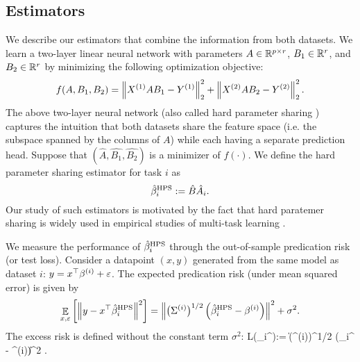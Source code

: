 
\subsection{Estimators}

We describe our estimators that combine the information from both datasets.
We learn a two-layer linear neural network with parameters $A \in \mathbb{R}^{p\times r}$, $B_1 \in \mathbb{R}^{r}$, and $B_2 \in \mathbb{R}^r$ by minimizing the following optimization objective:
\begin{align}\label{eq_hps}
    f(A, B_1, B_2) = \left\| X^{(1)} A B_1 - Y^{(1)} \right\|_2^2 + \left\| X^{(2)} A B_2 - Y^{(2)} \right\|_2^2.
\end{align}
The above two-layer neural network (also called hard parameter sharing \cite{C97}) captures the intuition that both datasets share the feature space (i.e. the subspace spanned by the columns of $A$) while each having a separate prediction head.
Suppose that $(\hat{A}, \hat{B_1}, \hat{B_2})$ is a minimizer of $f(\cdot)$.
We define the hard parameter sharing estimator for task $i$ as
\[ \hat{\beta}_i^{\textup{HPS}} := \hat{B} \hat{A}_i. \]
Our study of such estimators is motivated by the fact that hard paratemer sharing is widely used in empirical studies of multi-task learning \cite{R17}.



We measure the performance of $\hat{\beta}_i^{\textup{HPS}}$ through the out-of-sample predication risk (or test loss).
Consider a datapoint $(x,y)$ generated from the same model as dataset $i$: $y= x^\top \beta^{(i)} + {\varepsilon}$. %
The expected predication risk (under mean squared error) is given by
$$\mathop{\mathbb{E}}_{x, \varepsilon}\left[ \left\|y-x^\top \hat{\beta}_i^{\textup{HPS}} \right\|^2 \right]= \left\|\big(\Sigma^{(i)}\big)^{1/2} \left(\hat{\beta}_i^{\textup{HPS}} - \beta^{(i)}\right)\right\|^2 + \sigma^2.$$
The excess risk is defined without the constant term $\sigma^2$:
\be\label{HPS_loss}
    L(\hat{\beta}_i^{\MTL}):= \left\| \big(\Sigma^{(i)}\big)^{1/2} \left(\hat{\beta}_i^{\MTL} - \beta^{(i)}\right)\right\|^2 .
\ee

